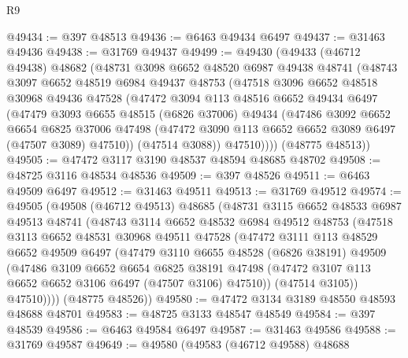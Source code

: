 \begin{lexlean}{R9}
\begin{coremodule}
@49434 := @397 @48513
@49436 := @6463 @49434 @6497
@49437 := @31463 @49436
@49438 := @31769 @49437
@49499 := @49430
    (@49433
      (@46712 @49438)
      @48682
      (@48731
        @3098
        @6652
        @48520
        @6987
        @49438
        @48741
        (@48743
          @3097
          @6652
          @48519
          @6984
          @49437
          @48753
          (@47518
            @3096
            @6652
            @48518
            @30968
            @49436
            @47528
            (@47472
              @3094
              @113
              @48516
              @6652
              @49434
              @6497
              (@47479
                @3093
                @6655
                @48515
                (@6826 @37006)
                @49434
                (@47486
                  @3092
                  @6652
                  @6654
                  @6825
                  @37006
                  @47498
                  (@47472 @3090 @113 @6652 @6652 @3089 @6497 (@47507 @3089) @47510))
                (@47514 @3088))
              @47510))))
      (@48775 @48513))
@49505 := @47472 @3117 @3190 @48537 @48594 @48685 @48702
@49508 := @48725 @3116 @48534 @48536
@49509 := @397 @48526
@49511 := @6463 @49509 @6497
@49512 := @31463 @49511
@49513 := @31769 @49512
@49574 := @49505
    (@49508
      (@46712 @49513)
      @48685
      (@48731
        @3115
        @6652
        @48533
        @6987
        @49513
        @48741
        (@48743
          @3114
          @6652
          @48532
          @6984
          @49512
          @48753
          (@47518
            @3113
            @6652
            @48531
            @30968
            @49511
            @47528
            (@47472
              @3111
              @113
              @48529
              @6652
              @49509
              @6497
              (@47479
                @3110
                @6655
                @48528
                (@6826 @38191)
                @49509
                (@47486
                  @3109
                  @6652
                  @6654
                  @6825
                  @38191
                  @47498
                  (@47472 @3107 @113 @6652 @6652 @3106 @6497 (@47507 @3106) @47510))
                (@47514 @3105))
              @47510))))
      (@48775 @48526))
@49580 := @47472 @3134 @3189 @48550 @48593 @48688 @48701
@49583 := @48725 @3133 @48547 @48549
@49584 := @397 @48539
@49586 := @6463 @49584 @6497
@49587 := @31463 @49586
@49588 := @31769 @49587
@49649 := @49580
    (@49583
      (@46712 @49588)
      @48688

\end{coremodule}
\end{lexlean}
